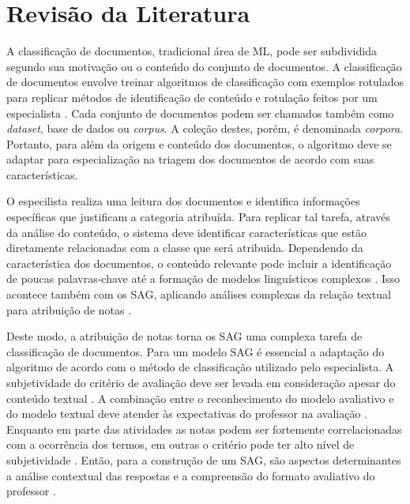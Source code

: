 \chapter{Revisão da Literatura}
\label{cap-literatura}


A classificação de documentos, tradicional área de ML, pode ser subdividida segundo sua motivação ou o conteúdo do conjunto de documentos. A classificação de documentos envolve treinar algoritmos de classificação com exemplos rotulados para replicar métodos de identificação de conteúdo e rotulação feitos por um especialista \cite{baeza2011}. Cada conjunto de documentos podem ser chamados também como \textit{dataset}, base de dados ou \textit{corpus}. A coleção destes, porém, é denominada \textit{corpora}. Portanto, para além da origem e conteúdo dos documentos, o algoritmo deve se adaptar para especialização na triagem dos documentos de acordo com suas características.

O especilista realiza uma leitura dos documentos e identifica informações específicas que justificam a categoria atribuída. Para replicar tal tarefa, através da análise do conteúdo, o sistema deve identificar características que estão diretamente relacionadas com a classe que será atribuida. Dependendo da característica dos documentos, o conteúdo relevante pode incluir a identificação de poucas palavras-chave até a formação de modelos linguísticos complexos \cite{jurafsky2009}. Isso acontece também com os SAG, aplicando análises complexas da relação textual para atribuição de notas \cite{paiva2012, yang2021}.

Deste modo, a atribuição de notas torna os SAG uma complexa tarefa de classificação de documentos. Para um modelo SAG é essencial a adaptação do algoritmo de acordo com o método de classificação utilizado pelo especialista. A subjetividade do critério de avaliação deve ser levada em consideração apesar do conteúdo textual \cite{pado2021}. A combinação entre o reconhecimento do modelo avaliativo e do modelo textual deve atender às expectativas do professor na avaliação \cite{condor2020}. Enquanto em parte das atividades as notas podem ser fortemente correlacionadas com a ocorrência dos termos, em outras o critério pode ter alto nível de subjetividade \cite{azad2020}. Então, para a construção de um SAG, são aspectos determinantes a análise contextual das respostas e a compreensão do formato avaliativo do professor \cite{mohler2011}.

